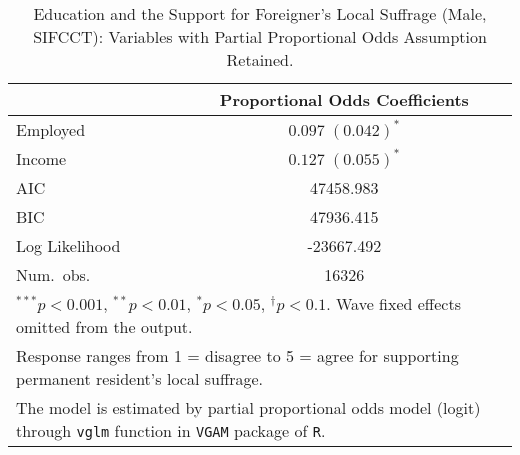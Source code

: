 
\begin{table}
\caption{Education and the Support for Foreigner's Local Suffrage (Male, SIFCCT): Variables with Partial Proportional Odds Assumption Retained.}
\begin{center}
\begin{tabular}{l c }
\toprule
 & Proportional Odds Coefficients \\
\midrule
Employed       & $0.097 \; (0.042)^{*}$ \\
Income         & $0.127 \; (0.055)^{*}$ \\
\midrule
AIC            & 47458.983              \\
BIC            & 47936.415              \\
Log Likelihood & -23667.492             \\
Num.\ obs.     & 16326                  \\
\bottomrule
\multicolumn{2}{l}{\scriptsize{$^{***}p<0.001$, $^{**}p<0.01$, $^*p<0.05$, $^{\dagger}p<0.1$. Wave fixed effects omitted from the output.}} \\ \multicolumn{2}{l}{\scriptsize{Response ranges from 1 = disagree to 5 = agree for supporting permanent resident's local suffrage.}} \\ \multicolumn{2}{l}{\scriptsize{The model is estimated by partial proportional odds model (logit) through \texttt{vglm} function in \texttt{VGAM} package of \texttt{R}.}}
\end{tabular}
\label{goltab_smom_pr}
\end{center}
\end{table}

